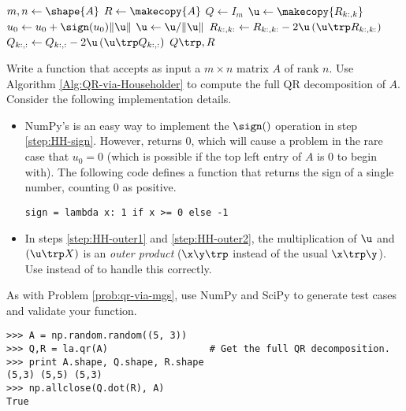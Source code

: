 \begin{algorithm}[H] %
\begin{algorithmic}[1]
    \State $m, n \gets \shape{A}$
    \State $R \gets \makecopy{A}$
    \State $Q \gets I_{m}$
        \State $\u \gets \makecopy{R_{k:,k}}$
        \State $u_0 \gets u_0 + \sign(u_0)\|\u\|$
            \label{step:HH-sign}
        \State $\u \gets \u/\|\u\|$
        \State $R_{k:,k:} \gets R_{k:,k:} - 2\u\left(\u\trp R_{k:,k:}\right)$
            \label{step:HH-outer1}
        \State $Q_{k:,:} \gets Q_{k:,:} - 2\u\left(\u\trp Q_{k:,:}\right)$
            \label{step:HH-outer2}
    \EndFor
    \State {} $Q\trp, R$
\EndProcedure
\end{algorithmic}
\caption{}
\label{Alg:QR-via-Householder}
\end{algorithm}

\begin{problem} %
Write a function that accepts as input a $m \times n$ matrix $A$ of rank $n$.
Use Algorithm \ref{Alg:QR-via-Householder} to compute the full QR decomposition of $A$.
Consider the following implementation details.
\begin{itemize}

\item NumPy's  is an easy way to implement the $\sign()$ operation in step \ref{step:HH-sign}.
However,  returns $0$, which will cause a problem in the rare case that $u_0 = 0$ (which is possible if the top left entry of $A$ is $0$ to begin with).
The following code defines a function that returns the sign of a single number, counting $0$ as positive.

\begin{lstlisting}
sign = lambda x: 1 if x >= 0 else -1
\end{lstlisting}

\item In steps \ref{step:HH-outer1} and \ref{step:HH-outer2}, the multiplication of $\u$ and $(\u\trp X)$ is an \emph{outer product} ($\x\y\trp$ instead of the usual $\x\trp\y$).
Use  instead of  to handle this correctly.

\end{itemize}

As with Problem \ref{prob:qr-via-mgs}, use NumPy and SciPy to generate test cases and validate your function.

\begin{lstlisting}
>>> A = np.random.random((5, 3))
>>> Q,R = la.qr(A)                  # Get the full QR decomposition.
>>> print A.shape, Q.shape, R.shape
(5,3) (5,5) (5,3)
>>> np.allclose(Q.dot(R), A)
True
\end{lstlisting}
\label{prob:qr-via-hessenberg}
\end{problem}

